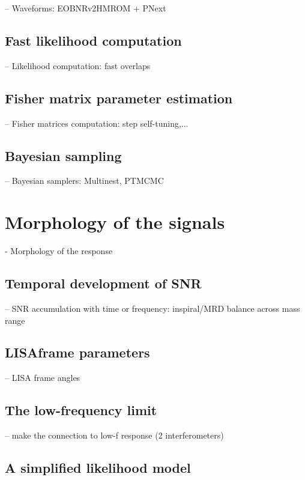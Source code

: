 \documentclass[aps,showpacs,twocolumn,prd,superscriptaddress,nofootinbib]{revtex4}
\begin{document}
-- Waveforms: EOBNRv2HMROM + PNext

\subsection{Fast likelihood computation}
\label{sec:likelihood}

-- Likelihood computation: fast overlaps

\subsection{Fisher matrix parameter estimation}
\label{sec:Fisher}

-- Fisher matrices computation: step self-tuning,...

\subsection{Bayesian sampling}
\label{sec:samplers}

-- Bayesian samplers: Multinest, PTMCMC


\section{Morphology of the signals}
\label{sec:morph}

- Morphology of the response

\subsection{Temporal development of SNR}
\label{sec:timeSNR}

-- SNR accumulation with time or frequency: inspiral/MRD balance across mass range

\subsection{LISAframe parameters}
\label{sec:LISAframe}

-- LISA frame angles

\subsection{The low-frequency limit}
\label{sec:low-freq}

-- make the connection to low-f response (2 interferometers)

\subsection{A simplified likelihood model}
\label{sec:simple-like}
\end{document}
